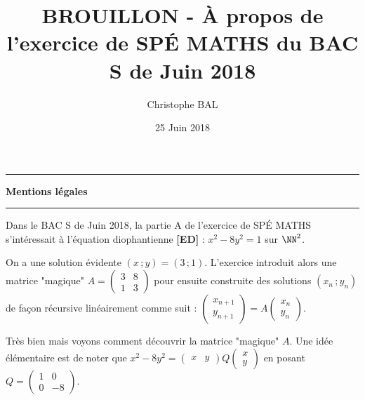 \documentclass[12pt]{amsart}
\begin{document}
\title{BROUILLON - À propos de l'exercice de SPÉ MATHS du BAC S de Juin 2018}
\author{Christophe BAL}
\date{25 Juin 2018}
\maketitle


\begin{center}
	\hrule\vspace{.3em}
	{
		\fontsize{1.35em}{1em}\selectfont
		\textbf{Mentions \og légales \fg}
	}
			
	\vspace{0.45em}
	\doclicenseThis
	\hrule
\end{center}


\bigskip


Dans le BAC S de Juin 2018, la partie A de l'exercice de SPÉ MATHS s'intéressait à l'équation diophantienne \textbf{[ED]} : $x^2 - 8 y^2 = 1$ sur $\NN^2$. 


\medskip

On a une solution évidente $(x \,; y) = (3 \,; 1)$. L'exercice introduit alors une matrice "magique"
$A =
\begin{pmatrix} 
  3 & 8  \\ 
  1 & 3 
\end{pmatrix}$
pour ensuite construite des solutions $(x_n \,; y_n)$ de façon récursive linéairement comme suit :
$\begin{pmatrix} 
  x_{n+1} \\ 
  y_{n+1} 
\end{pmatrix}
=
A
\begin{pmatrix} 
  x_{n} \\ 
  y_{n} 
\end{pmatrix}
$.


\medskip

Très bien mais voyons comment découvrir la matrice "magique" $A$. Une idée élémentaire est de noter que
$x^2 - 8 y^2
=
\begin{pmatrix} 
  x & y 
\end{pmatrix}
Q
\begin{pmatrix} 
  x \\ 
  y 
\end{pmatrix}$
en posant
$Q
=
\begin{pmatrix} 
  1 & 0  \\ 
  0 & -8 
\end{pmatrix}$.


\medskip
\end{document}
